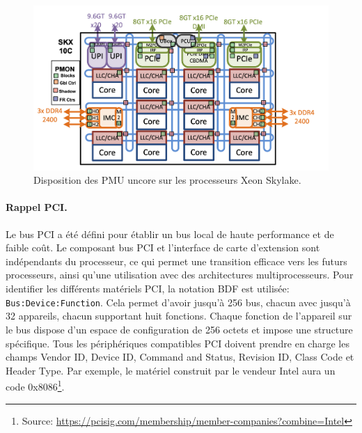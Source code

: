      
    \begin{figure}
    \center
    \includegraphics[width=12cm]{images/edl_perf_uncore_intel_skl.png}
    \caption{\label{fig:edl_perf_uncore_intel_skl} Disposition des PMU uncore sur les processeurs Xeon Skylake. \protect\footnotemark}
    \end{figure}

    
    \paragraph{Rappel PCI.} 
    Le bus PCI a été défini pour établir un bus local de haute performance et de faible coût. Le composant bus PCI et l'interface de carte d'extension sont indépendants du processeur, ce qui permet une transition efficace vers les futurs processeurs, ainsi qu'une utilisation avec des architectures multiprocesseurs. Pour identifier les différents matériels PCI, la notation BDF est utilisée: \verb| Bus:Device:Function|. Cela permet d'avoir jusqu'à 256 bus, chacun avec jusqu'à 32 appareils, chacun supportant huit fonctions. Chaque fonction de l'appareil sur le bus dispose d'un espace de configuration de 256 octets et impose une structure spécifique. Tous les périphériques compatibles PCI doivent prendre en charge les champs Vendor ID, Device ID, Command and Status, Revision ID, Class Code et Header Type. Par exemple, le matériel construit par le vendeur Intel aura un code 0x8086\footnote{Source: \url{https://pcisig.com/membership/member-companies?combine=Intel}}.
    
    

